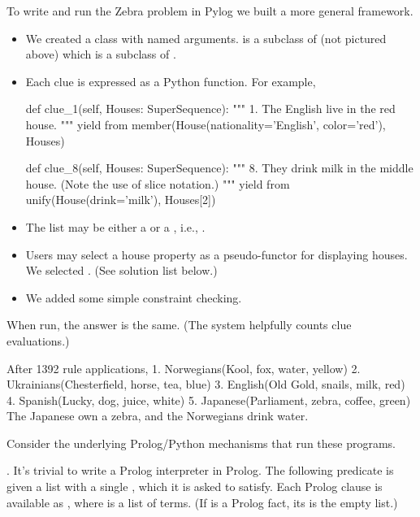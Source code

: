 To write and run the Zebra problem in Pylog we built a more general framework. 
\begin{itemize}
    \item \sloppy We created a  class with named arguments.  is a subclass of  (not pictured above) which is a subclass of  .
    \item Each clue is expressed as a Python function. For example,
\begin{python}
  def clue_1(self, Houses: SuperSequence):
    """ 1. The English live in the red house.  """
    yield from member(House(nationality='English', color='red'), Houses)

  def clue_8(self, Houses: SuperSequence):
    """ 8. They drink milk in the middle house. 
           (Note the use of slice notation.)     """
    yield from unify(House(drink='milk'), Houses[2])
\end{python}
    \item The  list may be either a  or a , i.e., .
    \item Users may select a house property as a pseudo-functor for displaying houses. We selected . (See solution list below.)
    \item We added some simple constraint checking.
\end{itemize}
When run, the answer is the same. (The system helpfully counts clue evaluations.)

\begin{minipage}{\linewidth}
\begin{python}
After 1392 rule applications,
	1. Norwegians(Kool, fox, water, yellow)
	2. Ukrainians(Chesterfield, horse, tea, blue)
	3. English(Old Gold, snails, milk, red)
	4. Spanish(Lucky, dog, juice, white)
	5. Japanese(Parliament, zebra, coffee, green)
The Japanese own a zebra, and the Norwegians drink water.
\end{python}
\end{minipage}
\smallv
Consider the underlying Prolog/Python mechanisms that run these programs. 
\smallv

. It's trivial to write a Prolog interpreter in Prolog. The following  predicate \cite{Bartak1998} is given a list with a single , which it is asked to satisfy. Each Prolog clause is available as , where   is a list of terms. (If  is a Prolog fact, its  is the empty list.)

